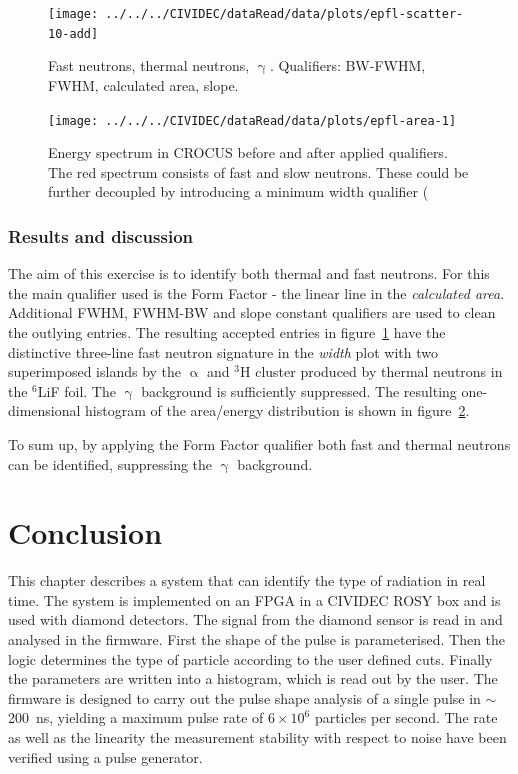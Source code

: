 \clearpage
\begin{figure}[]
\centering
\texttt{[image: ../../../CIVIDEC/dataRead/data/plots/epfl-scatter-10-add]}
\caption{Fast neutrons, thermal neutrons, $\upgamma$. Qualifiers: BW-FWHM, FWHM, calculated area, slope.}
\label{fig:scatterepfl2}
\end{figure}

\clearpage
\begin{figure}[!t]
\centering
\texttt{[image: ../../../CIVIDEC/dataRead/data/plots/epfl-area-1]}
\caption{Energy spectrum in CROCUS before and after applied qualifiers. The red spectrum consists of fast and slow neutrons. These could be further decoupled by introducing a minimum width qualifier (}
\label{fig:scatterepfl2area}
\end{figure}


\subsubsection{Results and discussion}
The aim of this exercise is to identify both thermal and fast neutrons. For this the main qualifier used is the Form Factor - the linear line in the \emph{calculated area}. Additional FWHM, FWHM-BW and slope constant qualifiers are used to clean the outlying entries. The resulting accepted entries in figure~\ref{fig:scatterepfl2} have the distinctive three-line fast neutron signature in the \emph{width} plot with two superimposed islands by the $\upalpha$ and $^3$H cluster produced by thermal neutrons in the $^6$LiF foil. The $\upgamma$ background is sufficiently suppressed. The resulting one-dimensional histogram of the area/energy distribution is shown in figure~\ref{fig:scatterepfl2area}.

To sum up, by applying the Form Factor qualifier both fast and thermal neutrons can be identified, suppressing the $\upgamma$ background.



\clearpage
\section{Conclusion}
\label{sec:conclcurrent}
This chapter describes a system that can identify the type of radiation in real time. The system is implemented on an FPGA in a CIVIDEC ROSY box and is used with diamond detectors. The signal from the diamond sensor is read in and analysed in the firmware. First the shape of the pulse is parameterised. Then the logic determines the type of particle according to the user defined cuts. Finally the parameters are written into a histogram, which is read out by the user. The firmware is designed to carry out the pulse shape analysis of a single pulse in $\sim$200~ns, yielding a maximum pulse rate of $6\times10^6$ particles per second. The rate as well as the linearity the measurement stability with respect to noise have been verified using a pulse generator. 

